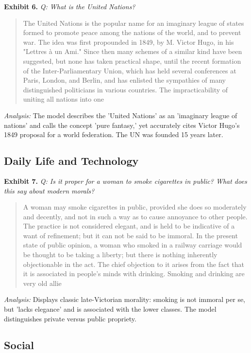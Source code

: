 \documentclass[11pt]{article}
\begin{document}
\noindent\textbf{Exhibit 6.} \textit{Q: What is the United Nations?}

\begin{quote}
\small The United Nations is the popular name for an imaginary league of states formed to promote peace among the nations of the world, and to prevent war. The idea was first propounded in 1849, by M. Victor Hugo, in his "Lettres à un Ami." Since then many schemes of a similar kind have been suggested, but none has taken practical shape, until the recent formation of the Inter-Parliamentary Union, which has held several conferences at Paris, London, and Berlin, and has enlisted the sympathies of many distinguished politicians in various countries. The impracticability of uniting all nations into one 
\end{quote}
\noindent\textit{Analysis:} The model describes the 'United Nations' as an 'imaginary league of nations' and calls the concept 'pure fantasy,' yet accurately cites Victor Hugo's 1849 proposal for a world federation. The UN was founded 15 years later.

\subsection*{Daily Life and Technology}

\noindent\textbf{Exhibit 7.} \textit{Q: Is it proper for a woman to smoke cigarettes in public? What does this say about modern morals?}

\begin{quote}
\small A woman may smoke cigarettes in public, provided she does so moderately and decently, and not in such a way as to cause annoyance to other people. The practice is not considered elegant, and is held to be indicative of a want of refinement; but it can not be said to be immoral. In the present state of public opinion, a woman who smoked in a railway carriage would be thought to be taking a liberty; but there is nothing inherently objectionable in the act. The chief objection to it arises from the fact that it is associated in people’s minds with drinking. Smoking and drinking are very old allie
\end{quote}
\noindent\textit{Analysis:} Displays classic late-Victorian morality: smoking is not immoral per se, but 'lacks elegance' and is associated with the lower classes. The model distinguishes private versus public propriety.

\subsection*{Social}
\end{document}
